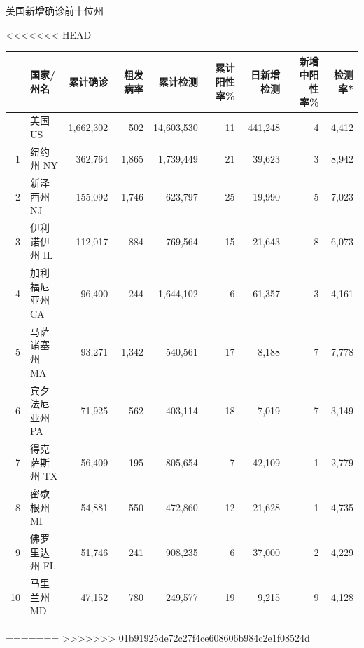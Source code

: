 \documentclass[]{article}
\begin{document}
\begin{table}[H]
    \vspace{-7mm}
    \begin{minipage}{.4\linewidth}
    \caption{美国新增确诊前十位州}
    \vspace{0.5\baselineskip}
<<<<<<< HEAD
      \centering
    \captionsetup{justification=centering} \begin{table}[H]
\centering
\begin{tabular}{rlrrrrrrr}
\toprule
  & 国家/州名 & 累计确诊 & 粗发病率 & 累计检测 & 累计阳性率\% & 日新增检测 & 新增中阳性率\% & 检测率*\\
\midrule
\rowcolor{gray!6}   & 美国 US & 1,662,302 & 502 & 14,603,530 & 11 & 441,248 & 4 & 4,412\\
1 & 纽约州 NY & 362,764 & 1,865 & 1,739,449 & 21 & 39,623 & 3 & 8,942\\
\rowcolor{gray!6}  2 & 新泽西州 NJ & 155,092 & 1,746 & 623,797 & 25 & 19,990 & 5 & 7,023\\
3 & 伊利诺伊州 IL & 112,017 & 884 & 769,564 & 15 & 21,643 & 8 & 6,073\\
\rowcolor{gray!6}  4 & 加利福尼亚州 CA & 96,400 & 244 & 1,644,102 & 6 & 61,357 & 3 & 4,161\\
5 & 马萨诸塞州 MA & 93,271 & 1,342 & 540,561 & 17 & 8,188 & 7 & 7,778\\
\rowcolor{gray!6}  6 & 宾夕法尼亚州 PA & 71,925 & 562 & 403,114 & 18 & 7,019 & 7 & 3,149\\
7 & 得克萨斯州 TX & 56,409 & 195 & 805,654 & 7 & 42,109 & 1 & 2,779\\
\rowcolor{gray!6}  8 & 密歇根州 MI & 54,881 & 550 & 472,860 & 12 & 21,628 & 1 & 4,735\\
9 & 佛罗里达州 FL & 51,746 & 241 & 908,235 & 6 & 37,000 & 2 & 4,229\\
\rowcolor{gray!6}  10 & 马里兰州 MD & 47,152 & 780 & 249,577 & 19 & 9,215 & 9 & 4,128\\
\bottomrule
\end{tabular}
\end{table} \end{minipage}%
    \begin{minipage}{.7\linewidth}
     \caption{美国新增死亡前十位州}
     \vspace{0.5\baselineskip}
=======
>>>>>>> 01b91925de72c27f4ce608606b984c2e1f08524d
      \centering
    \captionsetup{justification=centering} \begin{table}[H]
\centering
\begin{tabular}{rlrr}

\end{tabular}
\end{table}
\end{minipage}
\end{table}
\end{document}
